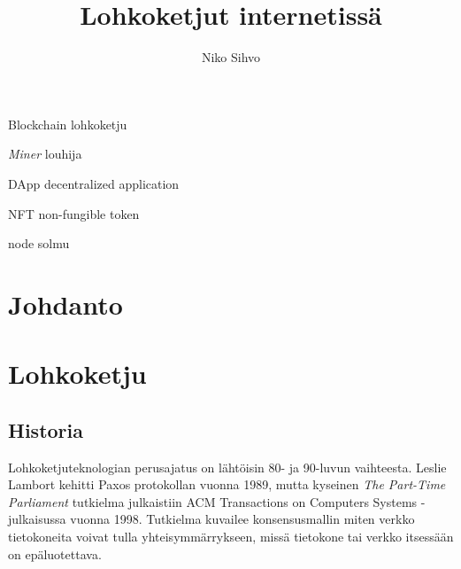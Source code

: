 \documentclass[utf8,bachelor]{gradu3}
\begin{document}
\title{Lohkoketjut internetissä}

\author{Niko Sihvo}


\maketitle


\begin{thetermlist}
\item[Blockchain] lohkoketju
\item[\emph{Miner}] louhija
\item[DApp] decentralized application
\item[NFT] non-fungible token
\item{node} solmu
\end{thetermlist}

\mainmatter

\chapter{Johdanto}




\chapter{Lohkoketju}
\section{Historia}

Lohkoketjuteknologian perusajatus on lähtöisin 80- ja 90-luvun vaihteesta. Leslie Lambort kehitti Paxos protokollan vuonna 1989, mutta kyseinen \emph{The Part-Time Parliament} \parencite{lamport2019part} tutkielma julkaistiin ACM Transactions on Computers Systems -julkaisussa vuonna 1998. Tutkielma kuvailee konsensusmallin miten verkko tietokoneita voivat tulla yhteisymmärrykseen, missä tietokone tai verkko itsessään on epäluotettava.
\end{document}
